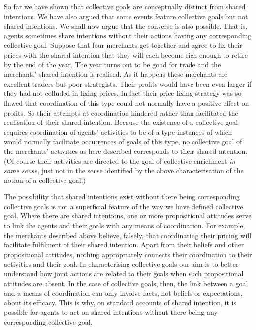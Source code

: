 \documentclass[12pt,a4paper]{extarticle}
\begin{document}
So far we have shown that collective goals are conceptually distinct from shared intentions.
We have also argued that some events feature collective goals but not shared intentions.
We shall now argue that the converse is also possible.
That is, agents sometimes share intentions without their actions having any corresponding collective goal.  
Suppose that four merchants get together and agree to fix their prices with the shared intention that they will each become rich enough to retire by the end of the year.  
The year turns out to be good for trade and the merchants'  shared intention is realised.
As it happens these merchants are excellent traders but poor strategists.
Their profits would have been even larger if they had not colluded in fixing prices.
In fact their price-fixing strategy was so flawed that coordination of this type could not normally have a positive effect on profits.
So their attempts at coordination hindered rather than facilitated the realisation of their shared intention.  
Because the existence of a collective goal requires coordination of agents' activities to be of a type instances of which would normally facilitate occurrences of  goals of this type, no collective goal of the merchants' activities as here described corresponds to their shared intention.
(Of course their activities are directed to the goal of collective enrichment \emph{in some sense}, just not in the sense identified by the above characterisation of the notion of a collective goal.)

The possibility that shared intentions exist without there being corresponding collective goals is not a superficial feature of the way we have defined collective goal.  
Where there are shared intentions, one or more propositional attitudes serve to link the agents and their goals with any  means of coordination.  
For example, the merchants described above believe, falsely, that coordinating their pricing will facilitate fulfilment of their shared intention.  
Apart from their beliefs and other propositional attitudes, nothing appropriately connects their coordination to their activities and their goal.
In characterising collective goals our aim is to better understand how joint actions are related to their goals when such propositional attitudes are absent.  
In the case of collective goals, then, the link between a goal and a means of coordination can only involve facts, not beliefs or expectations, about its efficacy.
This is why, on standard accounts of shared intention, it is possible for agents to act on shared intentions without there being any corresponding collective goal.  
\end{document}
